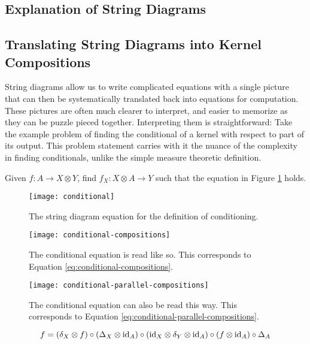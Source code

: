 \subsection{Explanation of String Diagrams}

\subsection{Translating String Diagrams into Kernel Compositions}
String diagrams allow us to write complicated equations with a single picture that can then be systematically translated back into equations for computation.
These pictures are often much clearer to interpret, and easier to memorize as they can be puzzle pieced together.
Interpreting them is straightforward: Take the example problem of finding the conditional of a kernel with respect to part of its output.
This problem statement carries with it the nuance of the complexity in finding conditionals, unlike the simple measure theoretic definition.

Given $f:A\rightarrow X\otimes Y$, find $f_X : X\otimes A \rightarrow Y$ such that the equation in Figure \ref{fig:conditional} holds.

\begin{figure}[htb]
	\centering
	\texttt{[image: conditional]}
	\caption{The string diagram equation for the definition of conditioning.}
	\label{fig:conditional}
\end{figure}

\begin{figure}[htb]
	\centering
	\texttt{[image: conditional-compositions]}
	\caption{The conditional equation is read like so. This corresponds to Equation \ref{eq:conditional-compositions}.}
	\label{fig:conditional-compositions}
\end{figure}

\begin{figure}[htb]
	\centering
	\texttt{[image: conditional-parallel-compositions]}
	\caption{The conditional equation can also be read this way. This corresponds to Equation \ref{eq:conditional-parallel-compositions}.}
	\label{fig:conditional-parallel-compositions}
\end{figure}

\begin{equation}
\label{eq:conditional-compositions}
f = (\delta_X \otimes f) \circ (\Delta_X \otimes \mathrm{id}_A)
\circ (\mathrm{id}_X \otimes \delta_Y \otimes \mathrm{id}_A) \circ (f \otimes \mathrm{id}_A) \circ \Delta_A
\end{equation}

